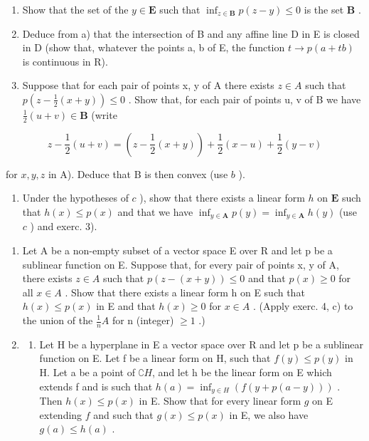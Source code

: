 \begin{enumerate}
\def\labelenumi{\alph{enumi})}
\item
  Show that the set of the \(y \in \mathbf{E}\) such that \(\inf_{z \in \mathbf{B}} p(z - y) \leqslant 0\) is the set \(\mathbf{B}\) .
\item
  Deduce from a) that the intersection of B and any affine line D in E is closed in D (show that, whatever the points a, b of E, the function \(t \rightarrow p(a + tb)\) is continuous in R).
\item
  Suppose that for each pair of points x, y of A there exists \(z \in A\) such that \(p(z - \frac{1}{2}(x + y)) \leqslant 0\) . Show that, for each pair of points u, v of B we have \(\frac{1}{2}(u + v) \in \mathbf{B}\) (write
\end{enumerate}

\[
z - \frac {1}{2} (u + v) = \left(z - \frac {1}{2} (x + y)\right) + \frac {1}{2} (x - u) + \frac {1}{2} (y - v)
\]

for \(x, y, z\) in A). Deduce that B is then convex (use \(b\) ).

\begin{enumerate}
\def\labelenumi{\alph{enumi})}
\setcounter{enumi}{3}
\tightlist
\item
  Under the hypotheses of \(c\) ), show that there exists a linear form \(h\) on \(\mathbf{E}\) such that \(h(x) \leqslant p(x)\) and that we have \(\inf_{y \in \mathbf{A}} p(y) = \inf_{y \in \mathbf{A}} h(y)\) (use \(c\) ) and exerc. 3).
\end{enumerate}

\begin{enumerate}
\def\labelenumi{\arabic{enumi})}
\setcounter{enumi}{4}
\item
  Let A be a non-empty subset of a vector space E over R and let p be a sublinear function on E. Suppose that, for every pair of points x, y of A, there exists \(z \in A\) such that \(p(z - (x + y)) \leqslant 0\) and that \(p(x) \geqslant 0\) for all \(x \in A\) . Show that there exists a linear form h on E such that \(h(x) \leqslant p(x)\) in E and that \(h(x) \geqslant 0\) for \(x \in A\) . (Apply exerc. 4, c) to the union of the \(\frac{1}{n}A\) for n (integer) \(\geqslant 1\) .)
\item
  \begin{enumerate}
  \def\labelenumii{\alph{enumii})}
  \tightlist
  \item
    Let H be a hyperplane in E a vector space over R and let p be a sublinear function on E. Let f be a linear form on H, such that \(f(y) \leqslant p(y)\) in H. Let a be a point of \(\complement H\), and let h be the linear form on E which extends f and is such that \(h(a) = \inf_{y \in H} (f(y + p(a - y)))\) . Then \(h(x) \leqslant p(x)\) in E. Show that for every linear form \(g\) on E extending \(f\) and such that \(g(x) \leqslant p(x)\) in E, we also have \(g(a) \leqslant h(a)\) .
  \end{enumerate}
\end{enumerate}

